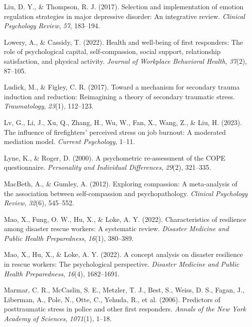 \documentclass[
  man,floatsintext]{apa7}
\newlength{\cslhangindent}
\newlength{\cslentryspacingunit} %
\newenvironment{CSLReferences}[2] %
 {%
  \setlength{\parindent}{0pt}
  \ifodd #1
  \let\oldpar\par
  \def\par{\hangindent=\cslhangindent\oldpar}
  \fi
  \setlength{\parskip}{#2\cslentryspacingunit}
 }%
 {}
\begin{document}
\begin{CSLReferences}{1}{0}
\leavevmode{}%
Liu, D. Y., \& Thompson, R. J. (2017). Selection and implementation of emotion regulation strategies in major depressive disorder: An integrative review. \emph{Clinical Psychology Review}, \emph{57}, 183--194.

\leavevmode{}%
Lowery, A., \& Cassidy, T. (2022). Health and well-being of first responders: The role of psychological capital, self-compassion, social support, relationship satisfaction, and physical activity. \emph{Journal of Workplace Behavioral Health}, \emph{37}(2), 87--105.

\leavevmode{}%
Ludick, M., \& Figley, C. R. (2017). Toward a mechanism for secondary trauma induction and reduction: Reimagining a theory of secondary traumatic stress. \emph{Traumatology}, \emph{23}(1), 112--123.

\leavevmode{}%
Lv, G., Li, J., Xu, Q., Zhang, H., Wu, W., Fan, X., Wang, Z., \& Liu, H. (2023). The influence of firefighters' perceived stress on job burnout: A moderated mediation model. \emph{Current Psychology}, 1--11.

\leavevmode{}%
Lyne, K., \& Roger, D. (2000). A psychometric re-assessment of the COPE questionnaire. \emph{Personality and Individual Differences}, \emph{29}(2), 321--335.

\leavevmode{}%
MacBeth, A., \& Gumley, A. (2012). Exploring compassion: A meta-analysis of the association between self-compassion and psychopathology. \emph{Clinical Psychology Review}, \emph{32}(6), 545--552.

\leavevmode{}%
Mao, X., Fung, O. W., Hu, X., \& Loke, A. Y. (2022). Characteristics of resilience among disaster rescue workers: A systematic review. \emph{Disaster Medicine and Public Health Preparedness}, \emph{16}(1), 380--389.

\leavevmode{}%
Mao, X., Hu, X., \& Loke, A. Y. (2022). A concept analysis on disaster resilience in rescue workers: The psychological perspective. \emph{Disaster Medicine and Public Health Preparedness}, \emph{16}(4), 1682--1691.

\leavevmode{}%
Marmar, C. R., McCaslin, S. E., Metzler, T. J., Best, S., Weiss, D. S., Fagan, J., Liberman, A., Pole, N., Otte, C., Yehuda, R., et al. (2006). Predictors of posttraumatic stress in police and other first responders. \emph{Annals of the New York Academy of Sciences}, \emph{1071}(1), 1--18.


\end{CSLReferences}
\end{document}
